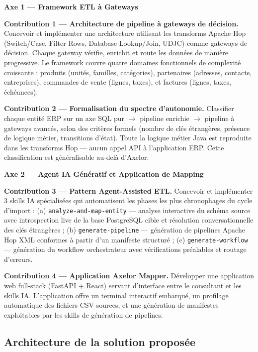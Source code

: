 \documentclass[a4paper,12pt]{article}
\begin{document}
\medskip
\noindent\textbf{Axe 1 — Framework ETL à Gateways}

\textbf{Contribution 1 — Architecture de pipeline à gateways de décision.}
Concevoir et implémenter une architecture utilisant les transforms Apache Hop (Switch/Case, Filter Rows, Database Lookup/Join, UDJC) comme gateways de décision. Chaque gateway vérifie, enrichit et route les données de manière progressive. Le framework couvre quatre domaines fonctionnels de complexité croissante : produits (unités, familles, catégories), partenaires (adresses, contacts, entreprises), commandes de vente (lignes, taxes), et factures (lignes, taxes, échéances).

\textbf{Contribution 2 — Formalisation du spectre d'autonomie.}
Classifier chaque entité ERP sur un axe SQL pur $\rightarrow$ pipeline enrichie $\rightarrow$ pipeline à gateways avancés, selon des critères formels (nombre de clés étrangères, présence de logique métier, transitions d'état). Toute la logique métier Java est reproduite dans les transforms Hop — aucun appel API à l'application ERP. Cette classification est généralisable au-delà d'Axelor.

\medskip
\noindent\textbf{Axe 2 — Agent IA Génératif et Application de Mapping}

\textbf{Contribution 3 — Pattern Agent-Assisted ETL.}
Concevoir et implémenter 3 skills IA spécialisées qui automatisent les phases les plus chronophages du cycle d'import : (a) \texttt{analyze-and-map-entity} — analyse interactive du schéma source avec introspection live de la base PostgreSQL cible et résolution conversationnelle des clés étrangères ; (b) \texttt{generate-pipeline} — génération de pipelines Apache Hop XML conformes à partir d'un manifeste structuré ; (c) \texttt{generate-workflow} — génération du workflow orchestrateur avec vérifications préalables et routage d'erreurs.

\textbf{Contribution 4 — Application Axelor Mapper.}
Développer une application web full-stack (FastAPI + React) servant d'interface entre le consultant et les skills IA. L'application offre un terminal interactif embarqué, un profilage automatique des fichiers CSV sources, et une génération de manifestes exploitables par les skills de génération de pipelines.

\subsection{Architecture de la solution proposée}
\end{document}
